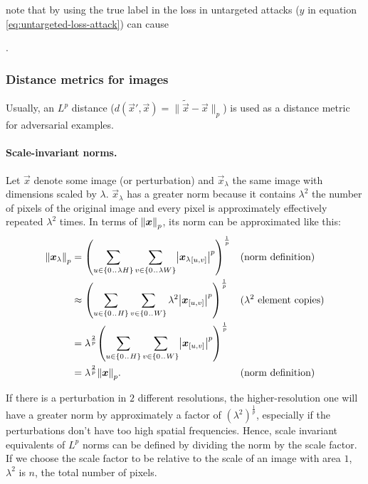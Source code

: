 \documentclass[oneside]{book}
\begin{document}
\citet{Kurakin:2016:AMLS} note that by using the true label in the loss in untargeted attacks ($y$ in equation \eqref{eq:untargeted-loss-attack}) can cause


\newpage
.
\newpage
\subsubsection{Distance metrics for images}

Usually, an $L^p$ distance ($d(\vec x', \vec x)=\lVert\tilde{\vec x}-\vec x\rVert_p$) is used as a distance metric for adversarial examples.

\paragraph{Scale-invariant norms.}
Let $\vec x$ denote some image (or perturbation) and $\vec x_\lambda$ the same image with dimensions scaled by $\lambda$. $\vec x_\lambda$ has a greater norm because it contains $\lambda^2$ the number of pixels of the original image and every pixel is approximately effectively repeated $\lambda^2$ times. In terms of $\enVert{\vec x}_p$, its norm can be approximated like this:
\begin{align*}
\enVert{\vec x_\lambda}_p 
&= \del{\sum_{u\in\cbr{0\bidot\lambda H}}\sum_{v\in\cbr{0\bidot\lambda W}} \envert{{\vec x_\lambda}_\ind{u, v}}^p}^{\frac{1}{p}} && \text{(norm definition)} \\
&\approx \del{\sum_{u\in\cbr{0\bidot H}}\sum_{v\in\cbr{0\bidot W}} \lambda^2 \envert{{\vec x}_\ind{u, v}}^p}^{\frac{1}{p}} && \text{($\lambda^2$ element copies)} \\
&= \lambda^\frac{2}{p} \del{\sum_{u\in\cbr{0\bidot H}}\sum_{v\in\cbr{0\bidot W}} \envert{{\vec x}_\ind{u, v}}^p}^{\frac{1}{p}} \\
&= \lambda^\frac{2}{p} \enVert{\vec x}_p \text{.} && \text{(norm definition)}
\end{align*}

If there is a perturbation in $2$ different resolutions, the higher-resolution one will have a greater norm by approximately a factor of $(\lambda^2)^\frac{1}{p}$, especially if the perturbations don't have too high spatial frequencies. Hence, scale invariant equivalents of $L^p$ norms can be defined by dividing the norm by the scale factor. If we choose the scale factor to be relative to the scale of an image with area $1$, $\lambda^2$ is $n$, the total number of pixels. 
\end{document}
